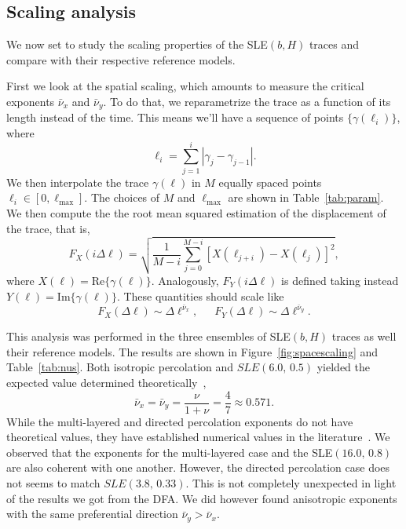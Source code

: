 \subsection{Scaling analysis}
\label{sec:slescal}

We now set to study the scaling properties of the SLE$(b,H)$ traces and compare
with their respective reference models.

First we look at the spatial scaling, which amounts to measure the critical
exponents $\bar{\nu}_x$ and $\bar{\nu}_y$. To do that, we reparametrize the
trace as a function of its length instead of the time. This means we'll have
a sequence of points $\{\gamma(\ell_i)\}$, where
\begin{equation}
    \ell_i = \sum_{j=1}^i \left|\gamma_j-\gamma_{j-1}\right|.
\end{equation}
We then interpolate the trace $\gamma(\ell)$ in $M$ equally spaced points
$\ell_i\in[0,\ell_{\max}]$. The choices of $M$ and $\ell_{\max}$ are shown in
Table~\ref{tab:param}. We then compute the the root mean squared estimation of
the displacement of the trace, that is,
\begin{equation}
    \label{eq:correl}
    F_X(i\Delta\ell) = \sqrt{\frac{1}{M-i}
    \sum_{j=0}^{M-i}{[X(\ell_{j+i}) - X(\ell_j)]}^2 },
\end{equation}
where $X(\ell) = \mbox{Re}\{\gamma(\ell)\}$.
Analogously, $F_Y(i\Delta\ell)$ is defined taking instead
$Y(\ell)=\mbox{Im}\{\gamma(\ell)\}$. These quantities should scale like
\begin{equation}
    F_{X}\left(\Delta\ell\right)\sim\Delta\ell^{\bar{\nu}_{x}},
    \,\,\,\,\,\,\,\,\,
    F_{Y}\left(\Delta\ell\right)\sim\Delta\ell^{\bar{\nu}_{y}}.
\end{equation}

This analysis was performed in the three ensembles of SLE$(b,H)$ traces as well
their reference models. The results are shown in Figure~\ref{fig:spacescaling}
and Table~\ref{tab:nus}. Both isotropic percolation and $SLE(6.0,\,0.5)$
yielded the expected value determined theoretically~\cite{Ziff1986}, 
\begin{equation}
    \bar{\nu}_x= \bar{\nu}_y= \frac{\nu}{1+\nu}=\frac{4}{7}\approx0.571.
\end{equation}
While the multi-layered and directed percolation exponents do not have
theoretical values, they have established numerical values in the
literature~\cite{Dayan1991, Owczarek1997}. We observed that the exponents for
the multi-layered case and the SLE$(16.0,\,0.8)$ are also coherent with one
another. However, the directed percolation case does not seems to match
$SLE(3.8,\,0.33)$. This is not completely unexpected in light of the
results we got from the DFA\@. We did however found anisotropic exponents with
the same preferential direction $\bar{\nu}_y>\bar{\nu}_x$.

